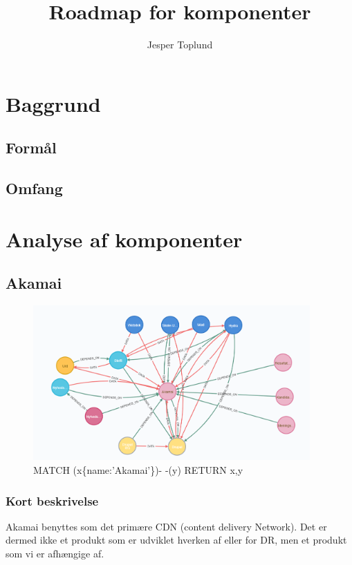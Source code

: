 \documentclass{article}
\author {Jesper Toplund}
\title{Roadmap for komponenter}
\date{}
\begin{document}
\maketitle

\vspace{20 mm}
\begin{quote}
    \textit{}
\end{quote}
\newpage{}
\clearpage

\section{Baggrund}
\subsection{Formål}


\subsection{Omfang}

\section{Analyse af komponenter}

\subsection{Akamai}
\begin{figure}[h]
\includegraphics[width=300pt]{Akamai.PNG}
\caption{MATCH (x\{name:'Akamai'\})- -(y) RETURN x,y}
\end{figure}
\subsubsection{Kort beskrivelse}
Akamai benyttes som det primære CDN (content delivery Network). 
Det er dermed ikke et produkt som er udviklet hverken af eller for DR, 
men et produkt som vi er afhængige af. 
\end{document}
